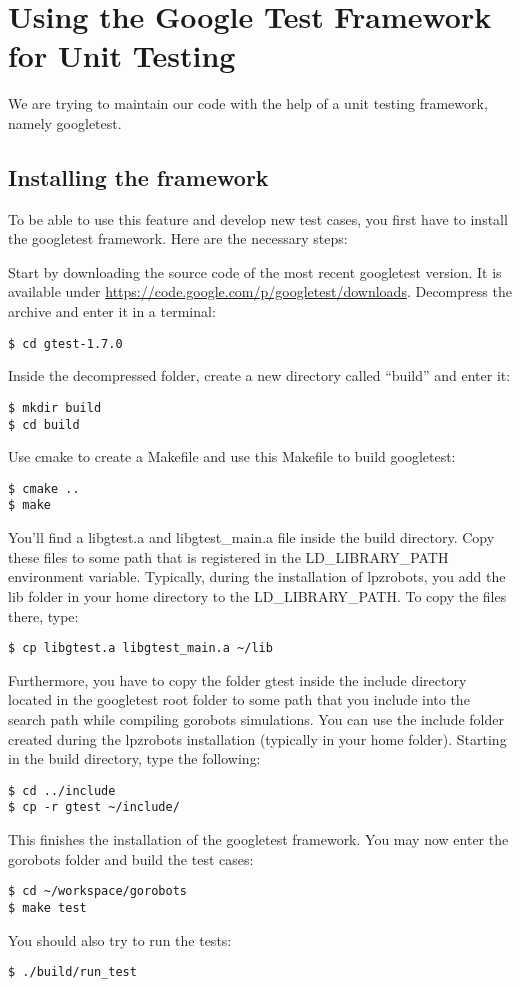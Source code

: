 \section{Using the Google Test Framework for Unit Testing}

We are trying to maintain our code with the help of a unit testing framework, 
namely googletest. 

\subsection{Installing the framework}

To be able to use this feature and develop new test cases, you first have to 
install the googletest framework. 
Here are the necessary steps:

Start by downloading the source code of the most recent googletest version. 
It is available under \url{https://code.google.com/p/googletest/downloads}. 
Decompress the archive and enter it in a terminal:
\begin{lstlisting}
$ cd gtest-1.7.0
\end{lstlisting}
Inside the decompressed folder, create a new directory called ``build'' and enter it:
\begin{lstlisting}
$ mkdir build
$ cd build
\end{lstlisting}
Use cmake to create a Makefile and use this Makefile to build googletest:
\begin{lstlisting}
$ cmake ..
$ make
\end{lstlisting}
You'll find a libgtest.a and libgtest\_main.a file inside the build directory. 
Copy these files to some path that is registered in the LD\_LIBRARY\_PATH 
environment variable. Typically, during the installation of lpzrobots, you add 
the lib folder in your home directory to the LD\_LIBRARY\_PATH. 
To copy the files there, type:
\begin{lstlisting}
$ cp libgtest.a libgtest_main.a ~/lib
\end{lstlisting}
Furthermore, you have to copy the folder gtest inside the include directory 
located in the googletest root folder to some path that you include into the 
search path while compiling gorobots simulations. 
You can use the include folder created during the lpzrobots installation 
(typically in your home folder). Starting in the build directory, type the 
following:
\begin{lstlisting}
$ cd ../include
$ cp -r gtest ~/include/
\end{lstlisting}
This finishes the installation of the googletest framework. 
You may now enter the gorobots folder and build the test cases:
\begin{lstlisting}
$ cd ~/workspace/gorobots
$ make test
\end{lstlisting}
You should also try to run the tests:
\begin{lstlisting}
$ ./build/run_test
\end{lstlisting}

